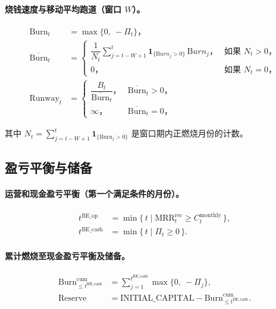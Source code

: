 \documentclass[11点, A4纸, 单面]{article}
\begin{document}
\paragraph{烧钱速度与移动平均跑道（窗口 $W$）。}
\begin{align}
\mathrm{Burn}_t &= \max\{0,\ -\Pi_t\}，\\
\overline{\mathrm{Burn}}_t 
  &= 
  \begin{cases}
    \dfrac{1}{N_t} \sum_{j=t-W+1}^{t} \mathbf{1}_{\{\mathrm Burn_j>0\}}\, \mathrm Burn_j， & \text{如果 } N_t>0，\\[6pt]
    0， & \text{如果 } N_t=0，
  \end{cases}\\
\mathrm{Runway}_t 
  &= 
  \begin{cases}
    \dfrac{B_t}{\overline{\mathrm{Burn}}_t}， & \overline{\mathrm{Burn}}_t > 0，\\[6pt]
    \infty， & \overline{\mathrm{Burn}}_t = 0，
  \end{cases}
\end{align}



其中 $N_t=\sum_{j=t-W+1}^{t}\mathbf{1}_{\{\mathrm{Burn}_j>0\}}$ 是窗口期内正燃烧月份的计数。

\subsection{盈亏平衡与储备}
\paragraph{运营和现金盈亏平衡（第一个满足条件的月份）。}
\begin{align}
t^{\mathrm{BE\_op}} 
  &= \min\{\, t \mid \mathrm{MRR}^{\mathrm{rec}}_t \ge C^{\mathrm{monthly}}_t \,\},\\
t^{\mathrm{BE\_cash}} 
  &= \min\{\, t \mid \Pi_t \ge 0 \,\}.
\end{align}

\paragraph{累计燃烧至现金盈亏平衡及储备。}
\begin{align}
\mathrm{Burn}^{\mathrm{cum}}_{\le t^{\mathrm{BE\_cash}}} 
  &= \sum_{j=1}^{t^{\mathrm{BE\_cash}}} \max\{0,\ -\Pi_j\},\\
\mathrm{Reserve}
  &= \text{INITIAL\_CAPITAL} - \mathrm{Burn}^{\mathrm{cum}}_{\le t^{\mathrm{BE\_cash}}}.
\end{align}
\end{document}

